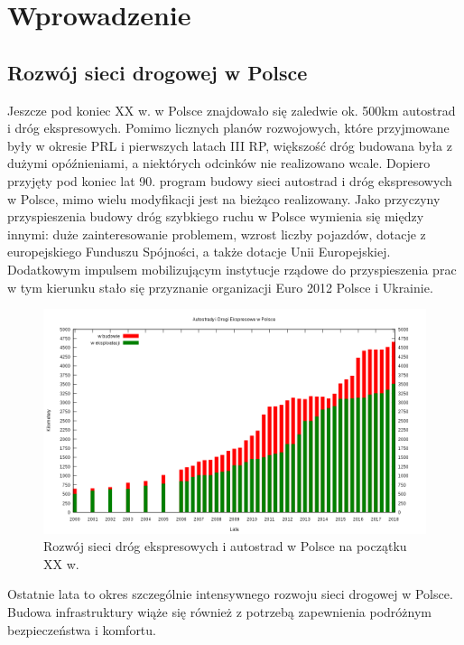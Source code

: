 \chapter{Wprowadzenie}

\section{Rozwój sieci drogowej w Polsce}
Jeszcze pod koniec XX w. w Polsce znajdowało się zaledwie ok. 500km autostrad i dróg ekspresowych. Pomimo licznych planów rozwojowych, które przyjmowane były w okresie PRL i pierwszych latach III RP, większość dróg budowana była z dużymi opóźnieniami, a niektórych odcinków nie realizowano wcale.\newline
Dopiero przyjęty pod koniec lat 90. program budowy sieci autostrad i dróg ekspresowych w Polsce, mimo wielu modyfikacji jest na bieżąco realizowany. Jako przyczyny\cite{siec-drogowa-IIIrp} przyspieszenia budowy dróg szybkiego ruchu w Polsce wymienia się między innymi: duże zainteresowanie problemem, wzrost liczby pojazdów, dotacje z europejskiego Funduszu Spójności, a także dotacje Unii Europejskiej. Dodatkowym impulsem mobilizującym instytucje rządowe do przyspieszenia prac w tym kierunku stało się przyznanie organizacji Euro 2012 Polsce i Ukrainie.\newline
\begin{figure}[h]
\caption{Rozwój sieci dróg ekspresowych i autostrad w Polsce na początku XX w.}
\includegraphics[width=\textwidth]{images/1024px-PL-Motorways.png}
\end{figure} \newline
Ostatnie lata to okres szczególnie intensywnego rozwoju sieci drogowej w Polsce. Budowa infrastruktury wiąże się również z potrzebą zapewnienia podróżnym bezpieczeństwa i komfortu.
